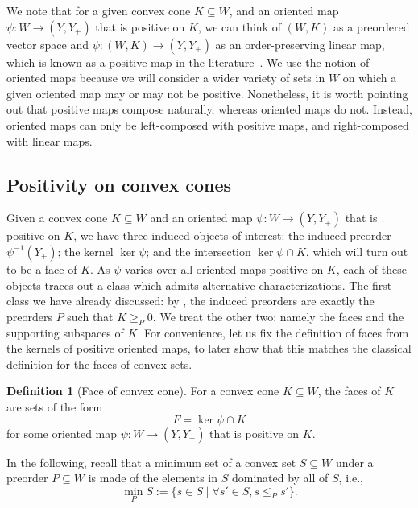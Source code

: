 \documentclass{article}
\theoremstyle{plain}
\theoremstyle{definition}
\newtheorem{definition}[definition]{Definition}
\theoremstyle{remark}
\begin{document}
We note that for a given convex cone $K \subseteq W$, and an oriented map
$\psi:W \to (Y, Y_+)$ that is positive on $K$, we can think of $(W, K)$
as a preordered vector space and $\psi:(W, K) \to (Y, Y_+)$ as an
order-preserving linear map, which is known as a positive map in the literature~\cite{bruynTensorProductsConvex2020}.
We use the notion of oriented maps because we will consider a wider
variety of sets in $W$ on which a given oriented map may or may not
be positive. Nonetheless, it is worth pointing out that positive maps
compose naturally, whereas oriented maps do not. Instead, oriented maps
can only be left-composed with positive maps, and right-composed with linear
maps.
\subsection{Positivity on convex cones}
\label{loc:body.positivity_minimization_and_faces.positivity_on_convex_cones}
Given a convex cone $K \subseteq W$ and an oriented map
$\psi:W \to (Y, Y_+)$ that is positive on $K$,
we have three induced objects of interest:
the induced preorder $\psi^{-1}(Y_+)$; the kernel $\ker \psi$; and the intersection $\ker \psi \cap K$, which will turn
out to be a face of $K$. As $\psi$ varies over all oriented maps positive on $K$,
each of these objects traces out a class which admits alternative characterizations.
The first class we have already discussed: by
, the induced
preorders are exactly the preorders $P$ such that $K \ge_{P} 0$.
We treat the other two: namely the faces and the supporting subspaces of $K$.
For convenience, let us fix the definition of faces from the kernels of positive oriented maps, to later show that this matches the classical definition for the faces of convex sets.
\begin{definition}[Face of convex cone]
\label{loc:face_of_convex_cone.statement}
For a convex cone $K \subseteq W$, the faces of $K$ are sets of the form 
\begin{equation*}
F = \ker \psi \cap K
\end{equation*}
for some oriented map $\psi:W \to (Y, Y_+)$ that is positive on $K$.
\end{definition}
In the following, recall that a minimum set of a convex set $S \subseteq W$ under a preorder $P \subseteq W$ is made of the elements in $S$ dominated by all of $S$, i.e.,
\begin{equation*}
\min_P S := \{ s  \in S \mid \forall s'  \in S, s \leq_{P} s'\}.
\end{equation*}
\end{document}
